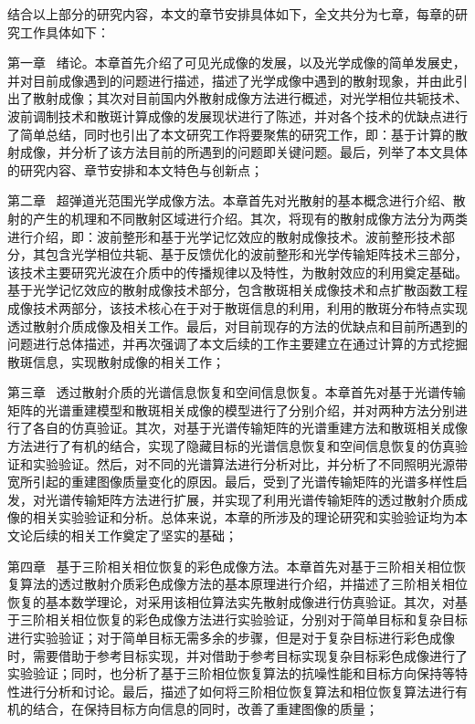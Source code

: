 结合以上部分的研究内容，本文的章节安排具体如下，全文共分为七章，每章的研究工作具体如下：

第一章 \ 绪论。本章首先介绍了可见光成像的发展，以及光学成像的简单发展史，并对目前成像遇到的问题进行描述，描述了光学成像中遇到的散射现象，并由此引出了散射成像；其次对目前国内外散射成像方法进行概述，对光学相位共轭技术、波前调制技术和散斑计算成像的发展现状进行了陈述，并对各个技术的优缺点进行了简单总结，同时也引出了本文研究工作将要聚焦的研究工作，即：基于计算的散射成像，并分析了该方法目前的所遇到的问题即关键问题。最后，列举了本文具体的研究内容、章节安排和本文特色与创新点；

第二章 \ 超弹道光范围光学成像方法。本章首先对光散射的基本概念进行介绍、散射的产生的机理和不同散射区域进行介绍。其次，将现有的散射成像方法分为两类进行介绍，即：波前整形和基于光学记忆效应的散射成像技术。波前整形技术部分，其包含光学相位共轭、基于反馈优化的波前整形和光学传输矩阵技术三部分，该技术主要研究光波在介质中的传播规律以及特性，为散射效应的利用奠定基础。基于光学记忆效应的散射成像技术部分，包含散斑相关成像技术和点扩散函数工程成像技术两部分，该技术核心在于对于散斑信息的利用，利用的散斑分布特点实现透过散射介质成像及相关工作。最后，对目前现存的方法的优缺点和目前所遇到的问题进行总体描述，并再次强调了本文后续的工作主要建立在通过计算的方式挖掘散斑信息，实现散射成像的相关工作；

第三章 \ 透过散射介质的光谱信息恢复和空间信息恢复。本章首先对基于光谱传输矩阵的光谱重建模型和散斑相关成像的模型进行了分别介绍，并对两种方法分别进行了各自的仿真验证。其次，对基于光谱传输矩阵的光谱重建方法和散斑相关成像方法进行了有机的结合，实现了隐藏目标的光谱信息恢复和空间信息恢复的仿真验证和实验验证。然后，对不同的光谱算法进行分析对比，并分析了不同照明光源带宽所引起的重建图像质量变化的原因。最后，受到了光谱传输矩阵的光谱多样性启发，对光谱传输矩阵方法进行扩展，并实现了利用光谱传输矩阵的透过散射介质成像的相关实验验证和分析。总体来说，本章的所涉及的理论研究和实验验证均为本文论后续的相关工作奠定了坚实的基础；

第四章 \ 基于三阶相关相位恢复的彩色成像方法。本章首先对基于三阶相关相位恢复算法的透过散射介质彩色成像方法的基本原理进行介绍，并描述了三阶相关相位恢复的基本数学理论，对采用该相位算法实先散射成像进行仿真验证。其次，对基于三阶相关相位恢复的彩色成像方法进行实验验证，分别对于简单目标和复杂目标进行实验验证；对于简单目标无需多余的步骤，但是对于复杂目标进行彩色成像时，需要借助于参考目标实现，并对借助于参考目标实现复杂目标彩色成像进行了实验验证；同时，也分析了基于三阶相位恢复算法的抗噪性能和目标方向保持等特性进行分析和讨论。最后，描述了如何将三阶相位恢复算法和相位恢复算法进行有机的结合，在保持目标方向信息的同时，改善了重建图像的质量；


